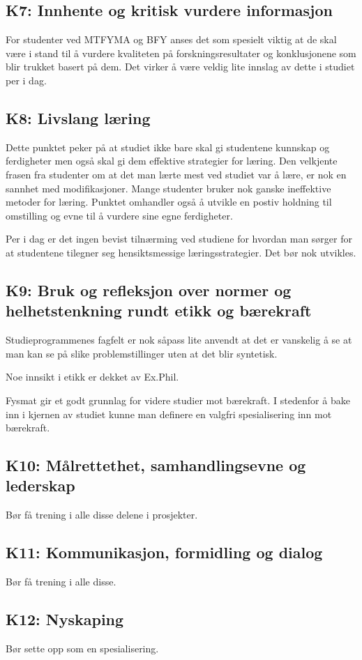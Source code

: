 \subsection{K7: Innhente og kritisk vurdere informasjon}
For studenter ved MTFYMA og BFY anses det som spesielt viktig at de skal være i stand til å vurdere kvaliteten på forskningsresultater og konklusjonene som blir trukket basert på dem. Det virker å være veldig lite innslag av dette i studiet per i dag.

\subsection{K8: Livslang læring}
Dette punktet peker på at studiet ikke bare skal gi studentene kunnskap og ferdigheter men også skal gi dem effektive strategier for læring. Den velkjente frasen fra studenter om at det man lærte mest ved studiet var å lære, er nok en sannhet med modifikasjoner. Mange studenter bruker nok ganske ineffektive metoder for læring. Punktet omhandler også å utvikle en postiv holdning til omstilling og evne til å vurdere sine egne ferdigheter.

Per i dag er det ingen bevist tilnærming ved studiene for hvordan man sørger for at studentene tilegner seg hensiktsmessige læringsstrategier. Det bør nok utvikles.

\subsection{K9: Bruk og refleksjon over normer og helhetstenkning rundt etikk og bærekraft} 
Studieprogrammenes fagfelt er nok såpass lite anvendt at det er vanskelig å se at man kan se på slike problemstillinger uten at det blir syntetisk.

Noe innsikt i etikk er dekket av Ex.Phil. 

Fysmat gir et godt grunnlag for videre studier mot bærekraft. I stedenfor å bake inn i kjernen av studiet kunne man definere en valgfri spesialisering inn mot bærekraft.

\subsection{K10: Målrettethet, samhandlingsevne og lederskap}

Bør få trening i alle disse delene i prosjekter.

\subsection{K11: Kommunikasjon, formidling og dialog}

Bør få trening i alle disse.

\subsection{K12: Nyskaping}

Bør sette opp som en spesialisering.